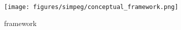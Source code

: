 \begin{figure}[!htbp]
\begin{center}
\texttt{[image: figures/simpeg/conceptual\_framework.png]}
\end{center}
\caption{
framework
}
\label{fig:simpeg-conceptual_framework}
\end{figure}
